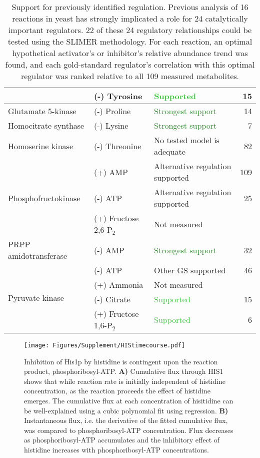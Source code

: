 \documentclass[12pt]{article}\usepackage{graphicx, color}
\begin{document}
\begin{table}[ht]
\begin{tabular}{|l|l|l|r|}
   & (-) Tyrosine & \textcolor{LimeGreen}{Supported} &  15 \\\hline 
  Glutamate 5-kinase & (-) Proline & \textcolor{ForestGreen}{Strongest support} &  14 \\\hline 
  Homocitrate synthase & (-) Lysine & \textcolor{ForestGreen}{Strongest support} &   7 \\\hline 
  Homoserine kinase & (-) Threonine & \textcolor{BurntOrange}{No tested model is adequate} &  82 \\\hline 
  \multirow{3}{*}{Phosphofructokinase} & (+) AMP & \textcolor{BurntOrange}{Alternative regulation supported} & 109 \\ 
   & (-) ATP & \textcolor{BurntOrange}{Alternative regulation supported} &  25 \\ 
   & (+) Fructose 2,6-P$_{2}$ & Not measured &  \\\hline 
  PRPP amidotransferase & (-) AMP & \textcolor{ForestGreen}{Strongest support} &  32 \\\hline 
  \multirow{4}{*}{Pyruvate kinase} & (-) ATP & Other GS supported &  46 \\ 
   & (+) Ammonia & Not measured &  \\ 
   & (-) Citrate & \textcolor{LimeGreen}{Supported} &  15 \\ 
   & (+) Fructose 1,6-P$_{2}$ & \textcolor{LimeGreen}{Supported} &   6 \\ 
   \hline
\end{tabular}
\caption{Support for previously identified regulation.  Previous analysis of 16 reactions in yeast has strongly implicated a role for 24 catalytically important regulators.  22 of these 24 regulatory relationships could be tested using the SLIMER methodology.  For each reaction, an optimal hypothetical activator's or inhibitor's relative abundance trend was found, and each gold-standard regulator's correlation with this optimal regulator was ranked relative to all 109 measured metabolites.}
\label{tab:GS}
\end{table}

\begin{figure}[h!]
\texttt{[image: Figures/Supplement/HIStimecourse.pdf]}
\caption{Inhibition of His1p by histidine is contingent upon the reaction product, phosphoribosyl-ATP.   \textbf{A)} Cumulative flux through HIS1 shows that while reaction rate is initially independent of histidine concentration, as the reaction proceeds the effect of histidine emerges. The cumulative flux at each concentration of hisitidine can be well-explained using a cubic polynomial fit using regression. \textbf{B)} Instantaneous flux, i.e. the derivative of the fitted cumulative flux, was compared to phosphoribosyl-ATP concentration.  Flux decreases as phosphoribosyl-ATP accumulates and the inhibitory effect of histidine increases with phosphoribosyl-ATP concentrations.}
\label{fig:atpprtase}
\end{figure}
\end{document}
